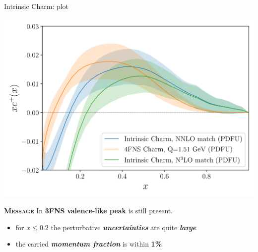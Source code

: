 \documentclass[9pt]{beamer}
\begin{document}
\begin{frame}{Intrinsic Charm: \pdf{} plot}
	\begin{center}
		\includegraphics[width=.7\linewidth]{4fns_3fns_nnlo_n3lo.png}
	\end{center}

    \textsc{\textbf{Message}} In \textbf{\alert{3FNS}} \textbf{valence-like
    peak} is still present.

	\begin{itemize}
        \item for \textbf{$x\leq 0.2$} the perturbative
            \textit{\textbf{uncertainties}} are quite \textit{\textbf{large}}
        \item the carried \textit{\textbf{momentum fraction}} is within \textbf{1\%}
	\end{itemize}
\end{frame}
\end{document}

